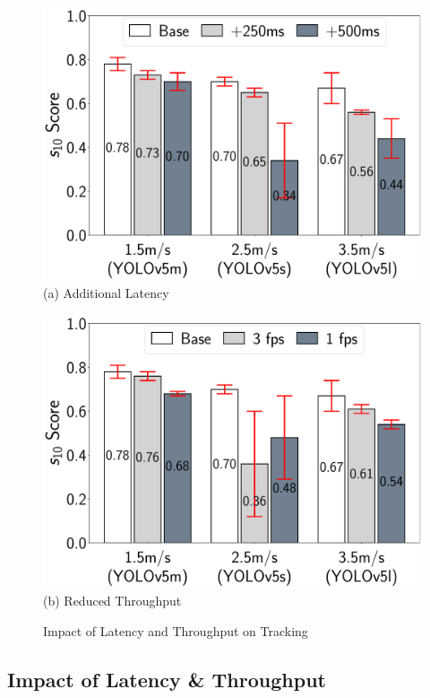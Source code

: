 \begin{figure}
\centering\small
\begin{minipage}{0.8\linewidth}
\centering
\includegraphics[width=0.98\linewidth]{chapter6/FIGS/fig-tracking-latency.pdf}\\
(a) Additional Latency
\end{minipage}
\begin{minipage}{0.8\linewidth}
\centering
\includegraphics[width=0.98\linewidth]{chapter6/FIGS/fig-tracking-fps.pdf}\\
(b) Reduced Throughput
\end{minipage}
\caption{Impact of Latency and Throughput on Tracking}
\label{fig:tracking-latency-throughput}
\end{figure}

\subsection{Impact of Latency \& Throughput}
\label{sec:tracking-factors}

